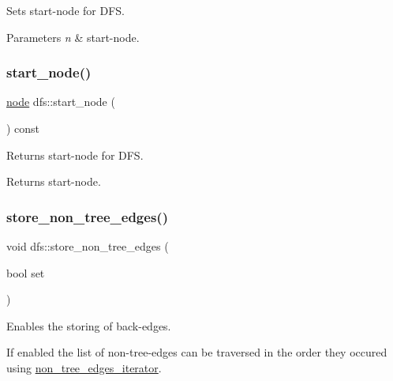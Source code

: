 Sets start-\/node for D\+FS. 


\begin{DoxyParams}{Parameters}
{\em n} & start-\/node. \\
\hline
\end{DoxyParams}
\mbox{\label{classdfs_a7688d8eaf1308438820fec2ffe21257c}} 
\subsubsection{\texorpdfstring{start\+\_\+node()}{start\_node()}\hspace{0.1cm}{\footnotesize\ttfamily [2/2]}}
{\footnotesize\ttfamily \mbox{\hyperlink{classnode}{node}} dfs\+::start\+\_\+node (\begin{DoxyParamCaption}{ }\end{DoxyParamCaption}) const\hspace{0.3cm}{\ttfamily [inline]}}



Returns start-\/node for D\+FS. 

\begin{DoxyReturn}{Returns}
start-\/node. 
\end{DoxyReturn}
\mbox{\label{classdfs_a6f54f1c4339eacc8961e795439d4593d}} 
\subsubsection{\texorpdfstring{store\+\_\+non\+\_\+tree\+\_\+edges()}{store\_non\_tree\_edges()}\hspace{0.1cm}{\footnotesize\ttfamily [1/2]}}
{\footnotesize\ttfamily void dfs\+::store\+\_\+non\+\_\+tree\+\_\+edges (\begin{DoxyParamCaption}\item[{bool}]{set }\end{DoxyParamCaption})}



Enables the storing of back-\/edges. 

If enabled the list of non-\/tree-\/edges can be traversed in the order they occured using \mbox{\hyperlink{classdfs_ae7301f3d4417e60fb3a499180375194e}{non\+\_\+tree\+\_\+edges\+\_\+iterator}}.


